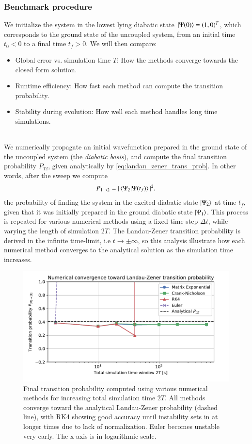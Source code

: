 \documentclass{subfiles}
\begin{document}
\subsubsection*{Benchmark procedure}
We initialize the system in the lowest lying diabatic state $\ket{\Psi(0)} = (1, 0)^T$, which corresponds to the ground state of the uncoupled system, from an initial time $t_0<0$ to a final time $t_f>0$. We will then compare:
\begin{itemize}
    \item Global error vs. simulation time $T$: How the methods converge towards the closed form solution.
    \item Runtime efficiency: How fast each method can compute the transition probability.
    \item Stability during evolution: How well each method handles long time simulations. 
\end{itemize}
\\ 
We numerically propagate an initial wavefunction prepared in the ground state of the uncoupled system (the \emph{diabatic basis}), and compute the final transition probability $P_{12}$, given analytically by \eqref{eq:landau_zener_trans_prob}. In other words, after the sweep we compute 
\begin{align*}
    P_{1\to2} = |\braket{\Psi_2|\Psi(t_f)}|^2,
\end{align*}
the probability of finding the system in the excited diabatic state $\ket{\Psi_2}$ at time $t_f$, given that it was initially prepared in the ground diabatic state $\ket{\Psi_1}$. This process is repeated for various numerical methods using a fixed time step $\Delta t$, while varying the length of simulation $2T$. The Landau-Zener transition probability is derived in the infinite time-limit, i.e $t\rightarrow \pm \infty$, so this analysis illustrate how each numerical method converges to the analytical solution as the simulation time increases.
\begin{figure}[h!]
\centering
\includegraphics[width=1.0\textwidth]{figs/landau_zener_convergence_benchmark.pdf}
\caption{Final transition probability computed using various numerical methods for increasing total simulation time $
2T$. All methods converge toward the analytical Landau-Zener probability (dashed line), with RK4 showing good accuracy until instability sets in at longer times due to lack of normalization. Euler becomes unstable very early. The x-axis is in logarithmic scale.}
\label{fig:landau_zener_convergence_benchmark}
\end{figure}
\end{document}
